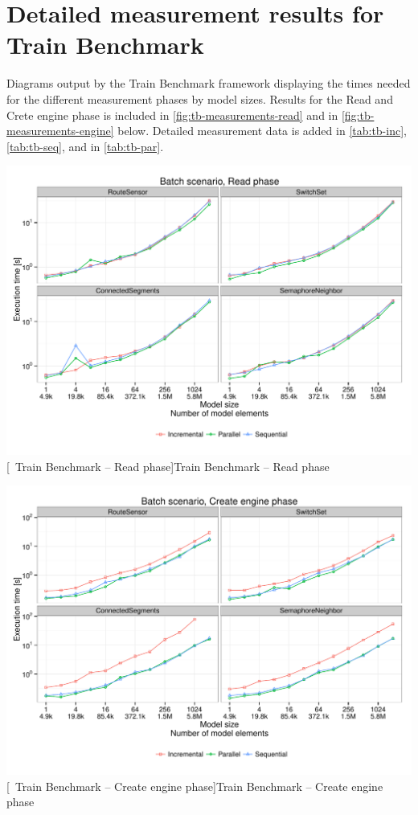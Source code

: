 \section{Detailed measurement results for Train Benchmark}
\label{appendix:trainbenchmark-results}
\begin{minipage}{1.0\textwidth}
	
	Diagrams output by the Train Benchmark framework displaying the times needed for the different measurement phases by model sizes. Results for the Read and Crete engine phase is included in \autoref{fig:tb-measurements-read} and in \autoref{fig:tb-measurements-engine} below. Detailed measurement data is added in \autoref{tab:tb-inc}, \autoref{tab:tb-seq}, and in \autoref{tab:tb-par}.
	
	\centering
	\includegraphics[width=\linewidth]{pdfs/Batch-Read-phase.pdf}
	\vspace{-35pt}
	[~Train Benchmark -- Read phase]{Train Benchmark -- Read phase}
	\vspace{10pt}
	\label{fig:tb-measurements-read}
	
	\includegraphics[width=\linewidth]{pdfs/Batch-Create-engine-phase.pdf}
	\vspace{-35pt}
	[~Train Benchmark -- Create engine phase]{Train Benchmark -- Create engine phase}
	\vspace{15pt}
	

\end{minipage}
